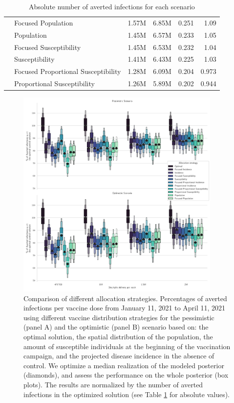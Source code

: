 \begin{table}[h!]
\begin{tabular}{llrrrr}
        & Focused Population &   1.57M &    6.85M &          0.251 &        1.09 \\
        & Population &   1.45M &    6.57M &          0.233 &        1.05 \\
        & Focused Susceptibility &   1.45M &    6.53M &          0.232 &        1.04 \\
        & Susceptibility &   1.41M &    6.43M &          0.225 &        1.03 \\
        & Focused Proportional Susceptibility &   1.28M &    6.09M &          0.204 &       0.973 \\
        & Proportional Susceptibility &   1.26M &    5.89M &          0.202 &       0.944 \\
\bottomrule
\end{tabular}
\caption{Absolute number of averted infections for each scenario}
\label{table:all_strat}
\end{table}

\begin{figure}[!ht]
    \centering
    \includegraphics[width=0.9\textwidth]{fig_italy-ocp/figuresSI/scenarios_perturb_all_SI.pdf}
    \caption[Comparison of different allocation strategies]{Comparison of different allocation strategies. Percentages of averted infections per vaccine dose from January 11, 2021 to April 11, 2021 using different vaccine distribution strategies for the pessimistic (panel A) and the optimistic (panel B) scenario based on: the optimal solution, the spatial distribution of the population, the amount of susceptible individuals at the beginning of the vaccination campaign, and the projected disease incidence in the absence of control. We optimize a median realization of the modeled posterior (diamonds), and assess the performance on the whole posterior (box plots). The results are normalized by the number of averted infections in the optimized solution (see Table \ref{table:all_strat} for absolute values).}
    \label{fig:OC_comparison_all}
\end{figure}


